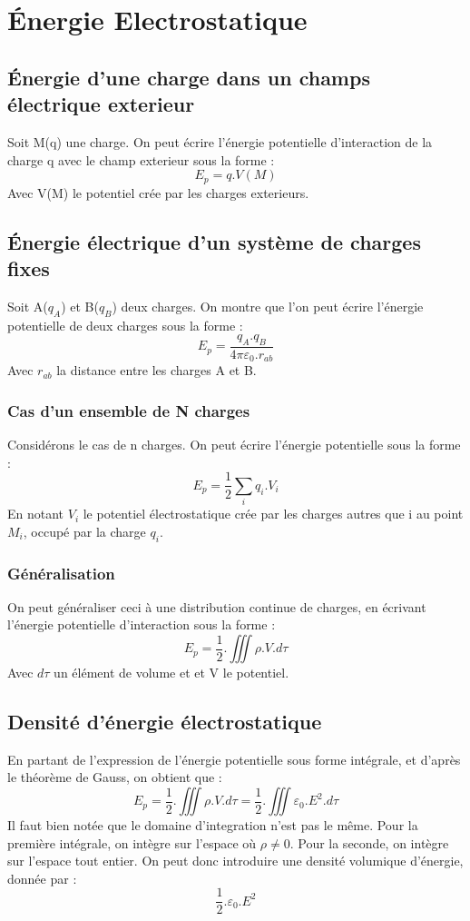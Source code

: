 \chapter{\'Energie Electrostatique}
\section{\'Energie d'une charge dans un champs électrique exterieur}
Soit M(q) une charge. On peut écrire l'énergie potentielle d'interaction de la charge q avec le champ exterieur sous la forme : 
$$E_p = q.V(M)$$
Avec V(M) le potentiel crée par les charges exterieurs.
\section{\'Energie électrique d'un système de charges fixes}
Soit A($q_A$) et B($q_B$) deux charges. On montre que l'on peut écrire l'énergie potentielle de deux charges sous la forme : 
$$E_p = \dfrac{q_A.q_B}{4\pi\varepsilon_0.r_{ab}}$$
Avec $r_{ab}$ la distance entre les charges A et B.
\subsection{Cas d'un ensemble de N charges}
Considérons le cas de n charges. On peut écrire l'énergie potentielle sous la forme : 
$$E_p = \dfrac{1}{2}\sum_i q_i.V_i$$
En notant $V_i$ le potentiel électrostatique crée par les charges autres que i au point $M_i$, occupé par la charge $q_i$.
\subsection{Généralisation}
On peut généraliser ceci à une distribution continue de charges, en écrivant l'énergie potentielle d'interaction sous la forme : 
$$E_p = \dfrac{1}{2}.\iiint \rho.V.d\tau$$
Avec $d\tau$ un élément de volume et et V le potentiel.
\section{Densité d'énergie électrostatique}
En partant de l'expression de l'énergie potentielle sous forme intégrale, et d'après le théorème de Gauss, on obtient que : 
$$E_p = \dfrac{1}{2}.\iiint \rho.V.d\tau = \dfrac{1}{2}.\iiint \varepsilon_0.E^2.d\tau$$
Il faut bien notée que le domaine d'integration n'est pas le même. Pour la première intégrale, on intègre sur l'espace où $\rho \neq 0$. Pour la seconde, on intègre sur l'espace tout entier. On peut donc introduire une densité volumique d'énergie, donnée par : 
$$\dfrac{1}{2}.\varepsilon_0.E^2$$
